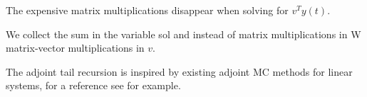 \documentclass[a4paper,12pt]{article}
\begin{document}



The expensive matrix multiplications disappear when solving for $v^{T}y(t)$.

\begin{julia}
  We collect the sum in the variable sol and instead of matrix multiplications in W
  matrix-vector multiplications in $v$.

\end{julia}

\begin{related}
  The adjoint tail recursion is inspired by existing adjoint MC methods for
  linear systems, for a reference see \cite{benzi_analysis_2017} for example.
\end{related}
\end{document}
